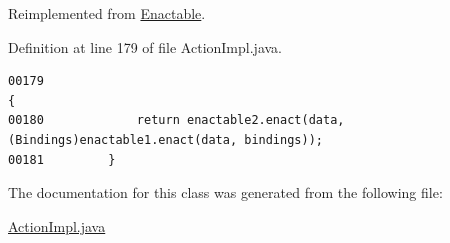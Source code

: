 Reimplemented from \hyperlink{interfaceEnactable_a0}{Enactable}.

Definition at line 179 of file Action\-Impl.java.\footnotesize\begin{verbatim}00179                                                                                    {
00180             return enactable2.enact(data, (Bindings)enactable1.enact(data, bindings));
00181         }
\end{verbatim}\normalsize 


The documentation for this class was generated from the following file:\begin{CompactItemize}
\item 
\hyperlink{ActionImpl_8java-source}{Action\-Impl.java}\end{CompactItemize}
